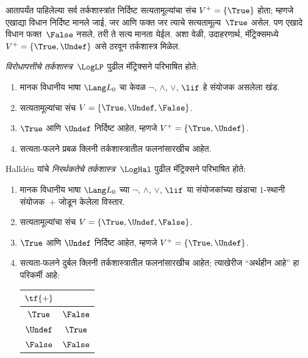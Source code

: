 \documentclass[../../../include/open-logic-section]{subfiles}
\begin{document}


आतापर्यंत पाहिलेल्या सर्व तर्कशास्त्रांत निर्दिष्ट
सत्यतामूल्यांचा संच $V^+ = \{\True\}$ होता; म्हणजे एखाद्या
विधान निर्दिष्ट मानले जाई, जर आणि फक्त जर त्याचे
सत्यतामूल्य~$\True$ असेल.
पण एखादे विधान फक्त~$\False$ नसले, तरी ते सत्य मानता येईल.
अशा वेळी, उदाहरणार्थ, मॅट्रिक्समध्ये
$V^+ = \{\True, \Undef\}$ असे ठरवून तर्कशास्त्र मिळेल.

\begin{defn}
\emph{विरोधापत्तीचे तर्कशास्त्र}~$\LogLP$ पुढील मॅट्रिक्सने
परिभाषित होते:
\begin{enumerate}
  \item मानक विधानीय भाषा $\Lang L_0$ चा केवळ
  $\lnot$, $\land$, $\lor$, $\lif$ हे संयोजक असलेला खंड.
  \item सत्यतामूल्यांचा संच $V = \{\True, \Undef, \False\}$.
  \item $\True$ आणि $\Undef$ निर्दिष्ट आहेत, म्हणजे $V^+ = \{\True, \Undef\}$.
  \item सत्यता-फलने प्रबळ क्लिनी तर्कशास्त्रातील फलनांसारखीच आहेत.
\end{enumerate}
\end{defn}

\begin{defn}
Halld\'en यांचे \emph{निरर्थकतेचे तर्कशास्त्र}~$\LogHal$
पुढील मॅट्रिक्सने परिभाषित होते:
\begin{enumerate}
  \item मानक विधानीय भाषा $\Lang L_0$ च्या
  $\lnot$, $\land$, $\lor$, $\lif$ या संयोजकांच्या खंडाचा
  $1$-स्थानी संयोजक~$+$ जोडून केलेला विस्तार.
  \item सत्यतामूल्यांचा संच $V = \{\True, \Undef, \False\}$.
  \item $\True$ आणि $\Undef$ निर्दिष्ट आहेत, म्हणजे $V^+ = \{\True, \Undef\}$.
  \item सत्यता-फलने दुर्बल क्लिनी तर्कशास्त्रातील फलनांसारखीच
  आहेत; त्याखेरीज ``अर्थहीन आहे'' हा परिकर्मी आहे:
  \begin{center}
    \begin{tabular}{c|c}
    $\tf{+}$ & \\
    \hline
    $\True$ & $\False$ \\
    $\Undef$ & $\True$ \\
    $\False$ & $\False$
    \end{tabular}
  \end{center}
\end{enumerate}
\end{defn}
\end{document}
